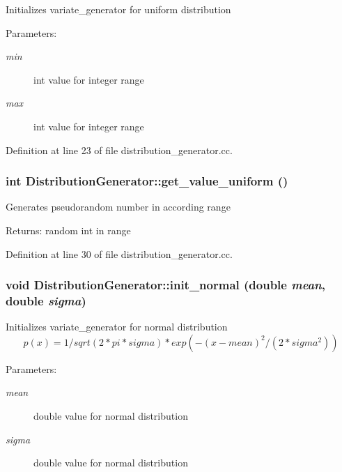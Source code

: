 Initializes variate\_\-generator for uniform distribution \begin{Desc}
\item[Parameters:]
\begin{description}
\item[{\em min}]int value for integer range \item[{\em max}]int value for integer range \end{description}
\end{Desc}


Definition at line 23 of file distribution\_\-generator.cc.\hypertarget{class_distribution_generator_60f7610a91c00ff1919613088c7aff59}{
\subsubsection[get\_\-value\_\-uniform]{\setlength{\rightskip}{0pt plus 5cm}int DistributionGenerator::get\_\-value\_\-uniform ()}}
\label{class_distribution_generator_60f7610a91c00ff1919613088c7aff59}


Generates pseudorandom number in according range \begin{Desc}
\item[Returns:]random int in range \end{Desc}


Definition at line 30 of file distribution\_\-generator.cc.\hypertarget{class_distribution_generator_91bfbf1fa31540fdccb5fccb98abbf9a}{
\subsubsection[init\_\-normal]{\setlength{\rightskip}{0pt plus 5cm}void DistributionGenerator::init\_\-normal (double {\em mean}, \/  double {\em sigma})}}
\label{class_distribution_generator_91bfbf1fa31540fdccb5fccb98abbf9a}


Initializes variate\_\-generator for normal distribution \[ p(x) = 1/sqrt(2*pi*sigma) * exp(- (x-mean)^2 / (2*sigma^2) ) \] \begin{Desc}
\item[Parameters:]
\begin{description}
\item[{\em mean}]double value for normal distribution \item[{\em sigma}]double value for normal distribution \end{description}
\end{Desc}


